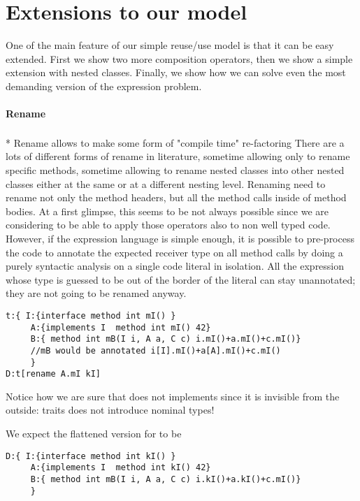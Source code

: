 \section{Extensions to our model}
  One of the main feature of our simple reuse/use model is that it can be
  easy extended. 
First we show two more composition operators, then we show 
a simple extension with nested classes.
Finally, we show how we can solve even the most
demanding version of the expression problem.

\paragraph{Rename}${}_{}$\\*
Rename allows to make some form of "compile time" re-factoring
There are a lots of different forms of rename in literature,
sometime allowing only to rename specific methods, sometime allowing to rename
nested classes into other nested classes either at the same or at a different nesting level.
Renaming need to rename not only the method headers, but all the method calls inside of method bodies.
At a first glimpse, this seems to be not always possible since we are considering to be able to apply those
operators also to non well typed code.
However, if the expression language is simple enough, it is possible to pre-process the code to
annotate the expected receiver type on all method calls by doing a purely syntactic analysis
on a single code literal in isolation. 
All the expression whose type is guessed to be out of the border of the literal can stay unannotated; they are not going to be renamed anyway.

\begin{lstlisting}
t:{ I:{interface method int mI() }
     A:{implements I  method int mI() 42}
     B:{ method int mB(I i, A a, C c) i.mI()+a.mI()+c.mI()}
     //mB would be annotated i[I].mI()+a[A].mI()+c.mI()
     }
D:t[rename A.mI kI]
\end{lstlisting}
 Notice how we are sure that \Q@C@ does not implements \Q@I@ since it is invisible from the outside: traits does not introduce nominal types!
 
 We expect the flattened version for \Q@D@ to be
\begin{lstlisting}
D:{ I:{interface method int kI() }
     A:{implements I  method int kI() 42}
     B:{ method int mB(I i, A a, C c) i.kI()+a.kI()+c.mI()}
     }
\end{lstlisting}

